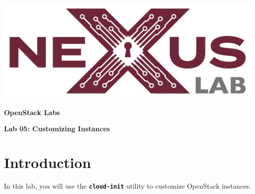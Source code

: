 \documentclass[letterpaper, 12pt]{article}
\begin{document}
\begin{titlepage}
    \centering
    \includegraphics[scale=0.5]{images/nexus_lab_logo.png}

    \vspace*{\baselineskip}

    \textbf{\Large OpenStack Labs}

    \vspace*{\baselineskip}

    \textbf{\Large Lab 05: Customizing Instances}
    \vspace*{\fill}
\end{titlepage}

{
    \fancyhf{}
    \fancyfoot[R]{\footnotesize\thepage}
    \renewcommand{\headrulewidth}{0pt}
}

\pagestyle{fancy}
\tableofcontents
\clearpage

\section*{Introduction}
\label{sec:introduction}
In this lab, you will use the \textbf{\texttt{cloud-init}} utility to customize OpenStack instances.
\end{document}
